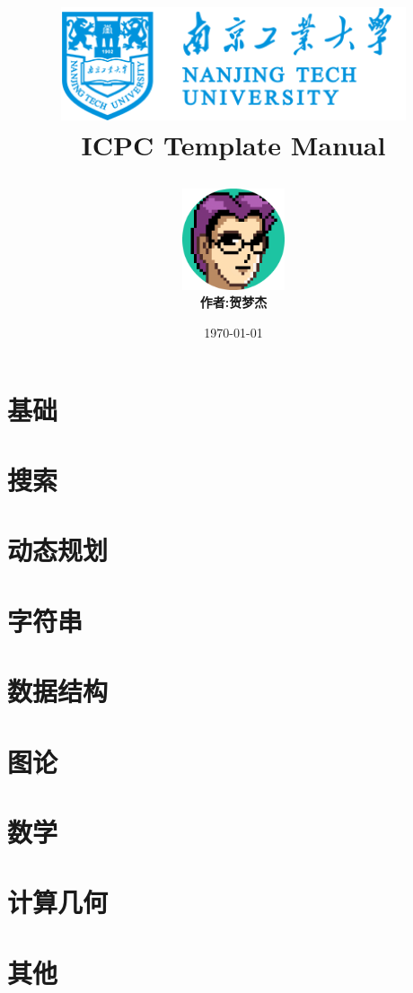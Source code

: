 \documentclass[12pt,a4paper,oneside]{book}
\title{
    \begin{center}
        \includegraphics[width=4in]{logo.png}
        \\ 
        \textbf{ICPC Template Manual}
    \end{center}
}
\author{
    \includegraphics[width=3cm]{author.png}
    \\
    \textbf{作者:贺梦杰}
}
\date{\today}
\begin{document}
    \maketitle
    \tableofcontents

    \chapter{基础}
    

    \chapter{搜索}
    

    \chapter{动态规划}
    

    \chapter{字符串}
    

    \chapter{数据结构}
    
    

    \chapter{图论}
    

    \chapter{数学}
    

    \chapter{计算几何}
    

    \chapter{其他}
    
\end{document}
